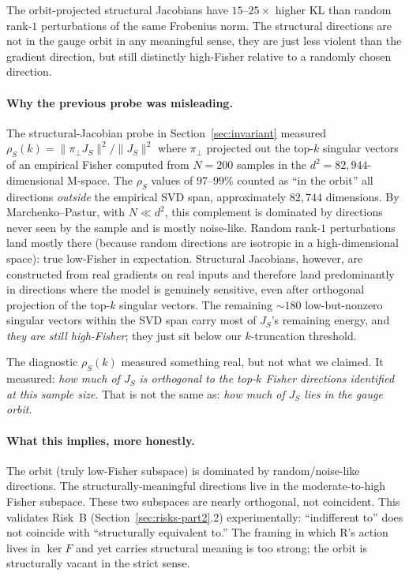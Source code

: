 \documentclass[11pt, a4paper]{article}
\theoremstyle{plain}
\theoremstyle{definition}
\theoremstyle{remark}
\begin{document}
The orbit-projected structural Jacobians have $15$--$25\times$ higher KL than random rank-$1$ perturbations of the same Frobenius norm.
The structural directions are not in the gauge orbit in any meaningful sense, they are just less violent than the gradient direction, but still distinctly high-Fisher relative to a randomly chosen direction.

\paragraph{Why the previous probe was misleading.}
The structural-Jacobian probe in Section~\ref{sec:invariant} measured $\rho_S(k) = \|\pi_\perp J_S\|^2 / \|J_S\|^2$ where $\pi_\perp$ projected out the top-$k$ singular vectors of an empirical Fisher computed from $N = 200$ samples in the $d^2 = 82{,}944$-dimensional M-space.
The $\rho_S$ values of $97$--$99\%$ counted as ``in the orbit'' all directions \emph{outside} the empirical SVD span, approximately $82{,}744$ dimensions.
By Marchenko--Pastur, with $N \ll d^2$, this complement is dominated by directions never seen by the sample and is mostly noise-like.
Random rank-$1$ perturbations land mostly there (because random directions are isotropic in a high-dimensional space): true low-Fisher in expectation.
Structural Jacobians, however, are constructed from real gradients on real inputs and therefore land predominantly in directions where the model is genuinely sensitive, even after orthogonal projection of the top-$k$ singular vectors.
The remaining $\sim 180$ low-but-nonzero singular vectors within the SVD span carry most of $J_S$'s remaining energy, and \emph{they are still high-Fisher}; they just sit below our $k$-truncation threshold.

The diagnostic $\rho_S(k)$ measured something real, but not what we claimed.
It measured: \emph{how much of $J_S$ is orthogonal to the top-$k$ Fisher directions identified at this sample size}.
That is not the same as: \emph{how much of $J_S$ lies in the gauge orbit}.

\paragraph{What this implies, more honestly.}
The orbit (truly low-Fisher subspace) is dominated by random/noise-like directions.
The structurally-meaningful directions live in the moderate-to-high Fisher subspace.
These two subspaces are nearly orthogonal, not coincident.
This validates Risk~B (Section~\ref{sec:risks-part2}.2) experimentally: ``indifferent to'' does not coincide with ``structurally equivalent to.'' The framing in which R's action lives in $\ker F$ and yet carries structural meaning is too strong; the orbit is structurally vacant in the strict sense.
\end{document}
